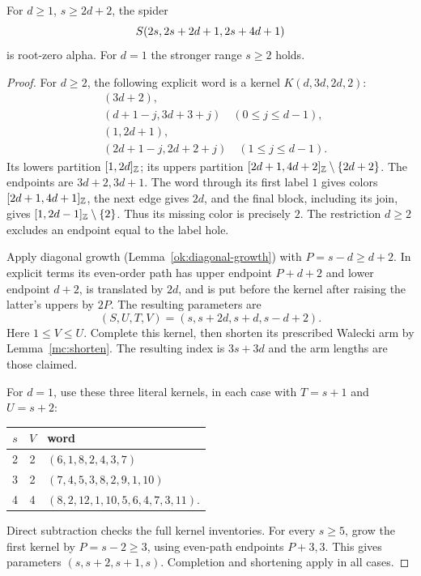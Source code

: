 \begin{lemma}\label{mc:eoo-ap}
For $d\ge1$, $s\ge2d+2$, the spider
\[
 S\!\left(2s,2s+2d+1,2s+4d+1\right)
\]
is root-zero alpha.  For $d=1$ the stronger range $s\ge2$ holds.
\end{lemma}
\begin{proof}
For $d\ge2$, the following explicit word is a kernel
$K(d,3d,2d,2)$:
\[
\begin{split}
 &(3d+2),\\
 &(d+1-j,3d+3+j)\quad(0\le j\le d-1),\\
 &(1,2d+1),\\
 &(2d+1-j,2d+2+j)\quad(1\le j\le d-1).
\end{split}
\]
Its lowers partition $[1,2d]_{\mathbb Z}$; its uppers partition
$[2d+1,4d+2]_{\mathbb Z}\setminus\{2d+2\}$.  The endpoints
are $3d+2,3d+1$.  The word through its first label $1$ gives
colors $[2d+1,4d+1]_{\mathbb Z}$, the next edge gives $2d$, and
the final block, including its join, gives
$[1,2d-1]_{\mathbb Z}\setminus\{2\}$.  Thus its missing color
is precisely $2$.  The restriction $d\ge2$ excludes an endpoint
equal to the label hole.

Apply diagonal growth (Lemma~\ref{ok:diagonal-growth}) with
$P=s-d\ge d+2$.  In explicit terms its even-order path has upper
endpoint $P+d+2$ and lower endpoint $d+2$, is translated by $2d$,
and is put before the kernel after raising the latter's uppers by
$2P$.  The resulting parameters are
\[
 (S,U,T,V)=(s,s+2d,s+d,s-d+2).
\]
Here $1\le V\le U$.  Complete this kernel, then shorten its
prescribed Walecki arm by Lemma~\ref{mc:shorten}.  The resulting
index is $3s+3d$ and the arm lengths are those claimed.

For $d=1$, use these three literal kernels, in each case with
$T=s+1$ and $U=s+2$:
\begin{center}\begin{tabular}{ccp{}}
$s$&$V$&word\\\midrule
2&2&$(6,1,8,2,4,3,7)$\\
3&2&$(7,4,5,3,8,2,9,1,10)$\\
4&4&$(8,2,12,1,10,5,6,4,7,3,11)$.
\end{tabular}\end{center}
Direct subtraction checks the full kernel inventories.  For every
$s\ge5$, grow the first kernel by $P=s-2\ge3$, using even-path
endpoints $P+3,3$.  This gives parameters $(s,s+2,s+1,s)$.
Completion and shortening apply in all cases.
\end{proof}

